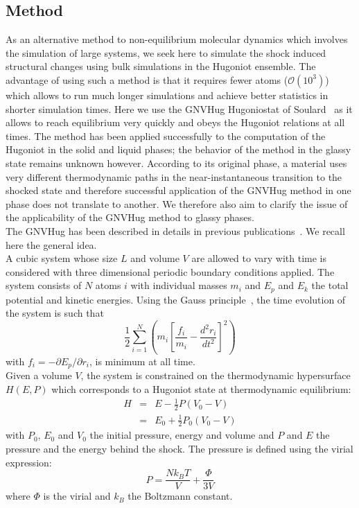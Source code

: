 \documentclass[aps,10pt,twocolumn]{revtex4}
\begin{document}
\subsection{Method}

As an alternative method to non-equilibrium molecular dynamics which involves the simulation of
large systems, we seek here to simulate the shock induced structural changes using bulk
simulations in the Hugoniot ensemble. The advantage of using such a method is that it
requires fewer atoms ($\mathcal{O}(10^{3})$) which allows to run much longer simulations and
achieve better statistics in shorter simulation times. Here we use the GNVHug Hugoniostat of
Soulard~\cite{Soulard99} as it allows to reach equilibrium very quickly and obeys the Hugoniot
relations at all times. The method has been applied successfully to the
computation of the Hugoniot in the solid and liquid phases; the behavior of the method in the
glassy state remains unknown however. According to its original phase, a material uses very
different thermodynamic paths in the near-instantaneous transition to the shocked state and therefore
successful application of the GNVHug method in one phase does not translate to another. We
therefore also aim to clarify the issue of the applicability of the GNVHug method to glassy phases.\\
The GNVHug has been described  in details in previous publications~\cite{Soulard99,Soulard01}.
We recall here the general idea.\\ 

A cubic system whose size $L$ and volume $V$ are allowed to vary with time is considered with
three dimensional periodic boundary conditions applied. The system consists of $N$ atoms $i$ 
with individual masses $m_i$ and $E_p$ and $E_k$ the total potential and kinetic energies. Using the Gauss
principle~\cite{hoo01,eva01ST,mor03ST}, the time evolution of the system is such that 
\begin{equation}
\frac{1}{2}\sum_{i=1}^{N}\left( m_{i}\left[ \frac{f_{i}}{m_{i}}-\frac{d^2r_i}{dt^2}\right]^{2} \right)  \label{Eq2}
\end{equation}
with $f_{i}=-\partial E_p/\partial r_i$, is minimum at all time.\\

Given a volume $V$, the system is constrained on the thermodynamic hypersurface $H\left(
E,P\right)$ which corresponds to a Hugoniot state at thermodynamic equilibrium:
\begin{eqnarray}
H &=&E-\frac{1}{2}P\left( V_{0}-V\right) \nonumber \\ &=& E_{0}+\frac{1}{2}P_{0}\left(
V_{0}-V\right)  \label{Eq3} 
\end{eqnarray}
with $P_{0}$, $E_{0}$ and $V_{0}$ the initial pressure, energy and volume and $P$ and $E$
the pressure and the energy behind the shock. The pressure is defined using the virial
expression: 
\begin{equation}
P=\frac{Nk_{B}T}{V}+\frac{\Phi}{3V}  \label{Eq4b}
\end{equation}
where $\Phi$ is the virial and $k_{B}$ the Boltzmann constant.\\
\end{document}
